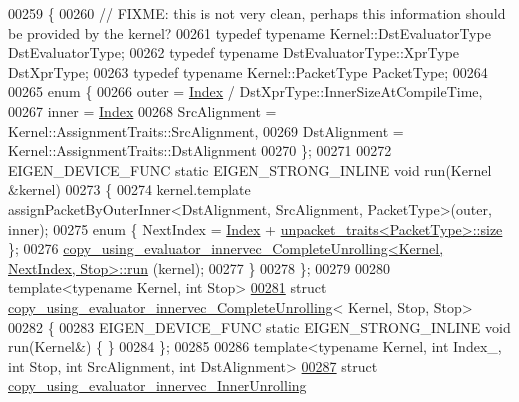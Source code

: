 \begin{DoxyCode}
00259 \{
00260   \textcolor{comment}{// FIXME: this is not very clean, perhaps this information should be provided by the kernel?}
00261   \textcolor{keyword}{typedef} \textcolor{keyword}{typename} Kernel::DstEvaluatorType DstEvaluatorType;
00262   \textcolor{keyword}{typedef} \textcolor{keyword}{typename} DstEvaluatorType::XprType DstXprType;
00263   \textcolor{keyword}{typedef} \textcolor{keyword}{typename} Kernel::PacketType PacketType;
00264   
00265   \textcolor{keyword}{enum} \{
00266     outer = \hyperlink{namespace_eigen_a62e77e0933482dafde8fe197d9a2cfde}{Index} / DstXprType::InnerSizeAtCompileTime,
00267     inner = \hyperlink{namespace_eigen_a62e77e0933482dafde8fe197d9a2cfde}{Index} %
00268     SrcAlignment = Kernel::AssignmentTraits::SrcAlignment,
00269     DstAlignment = Kernel::AssignmentTraits::DstAlignment
00270   \};
00271 
00272   EIGEN\_DEVICE\_FUNC \textcolor{keyword}{static} EIGEN\_STRONG\_INLINE \textcolor{keywordtype}{void} run(Kernel &kernel)
00273   \{
00274     kernel.template assignPacketByOuterInner<DstAlignment, SrcAlignment, PacketType>(outer, inner);
00275     \textcolor{keyword}{enum} \{ NextIndex = \hyperlink{namespace_eigen_a62e77e0933482dafde8fe197d9a2cfde}{Index} + \hyperlink{struct_eigen_1_1internal_1_1unpacket__traits}{unpacket\_traits<PacketType>::size} \};
00276     
      \hyperlink{struct_eigen_1_1internal_1_1copy__using__evaluator__innervec___complete_unrolling}{copy\_using\_evaluator\_innervec\_CompleteUnrolling<Kernel, NextIndex, Stop>::run}
      (kernel);
00277   \}
00278 \};
00279 
00280 \textcolor{keyword}{template}<\textcolor{keyword}{typename} Kernel, \textcolor{keywordtype}{int} Stop>
\hyperlink{struct_eigen_1_1internal_1_1copy__using__evaluator__innervec___complete_unrolling_3_01_kernel_00_01_stop_00_01_stop_01_4}{00281} \textcolor{keyword}{struct }\hyperlink{struct_eigen_1_1internal_1_1copy__using__evaluator__innervec___complete_unrolling}{copy\_using\_evaluator\_innervec\_CompleteUnrolling}<
      Kernel, Stop, Stop>
00282 \{
00283   EIGEN\_DEVICE\_FUNC \textcolor{keyword}{static} EIGEN\_STRONG\_INLINE \textcolor{keywordtype}{void} run(Kernel&) \{ \}
00284 \};
00285 
00286 \textcolor{keyword}{template}<\textcolor{keyword}{typename} Kernel, \textcolor{keywordtype}{int} Index\_, \textcolor{keywordtype}{int} Stop, \textcolor{keywordtype}{int} SrcAlignment, \textcolor{keywordtype}{int} DstAlignment>
\hyperlink{struct_eigen_1_1internal_1_1copy__using__evaluator__innervec___inner_unrolling}{00287} \textcolor{keyword}{struct }\hyperlink{struct_eigen_1_1internal_1_1copy__using__evaluator__innervec___inner_unrolling}{copy\_using\_evaluator\_innervec\_InnerUnrolling}

\end{DoxyCode}
